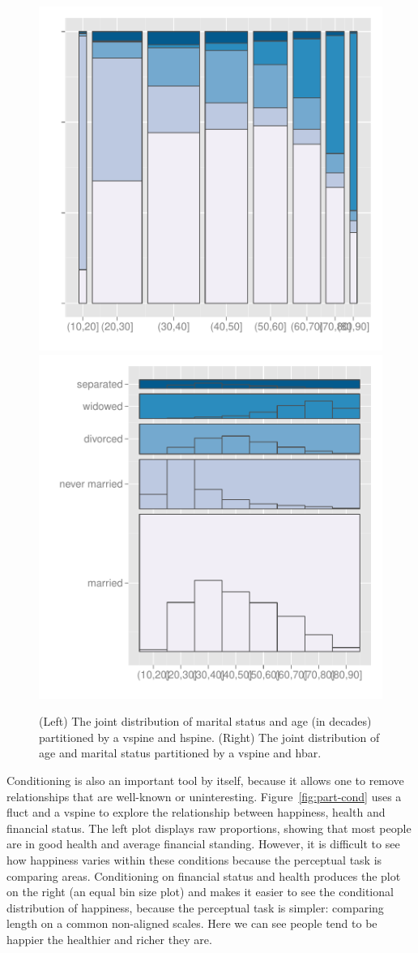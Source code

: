\documentclass[letterpaper,oneside]{scrartcl}
\begin{document}
\begin{figure}[htbp]
  \centering
    \includegraphics[width=0.5\linewidth]{part-marital-1}%
    \includegraphics[width=0.5\linewidth]{part-marital-2}
  \caption{(Left) The joint distribution of marital status and age (in decades) partitioned by a vspine and hspine.  (Right) The joint distribution of age and marital status partitioned by a vspine and hbar.}
  \label{fig:marital}
\end{figure}

Conditioning is also an important tool by itself, because it allows one to remove relationships that are well-known or uninteresting. Figure~\ref{fig:part-cond} uses a fluct and a vspine to explore the relationship between happiness, health and financial status. The left plot displays raw proportions, showing that most people are in good health and average financial standing. However, it is difficult to see how happiness varies within these conditions because the perceptual task is comparing areas. Conditioning on financial status and health produces the plot on the right (an equal bin size plot) and makes it easier to see the conditional distribution of happiness, because the perceptual task is simpler: comparing length on a common non-aligned scales.  Here we can see people tend to be happier the healthier and richer they are.
\end{document}
